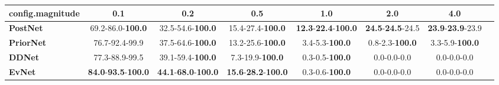 \begin{tabular}{lccccccc}
\toprule
\textbf{config.magnitude} &                                         0.1 &                                         0.2 &                                         0.5 &                                         1.0 &                               2.0 &                               4.0 \\
\midrule
\textbf{PostNet } &                    69.2-86.0-\textbf{100.0} &                    32.5-54.6-\textbf{100.0} &                    15.4-27.4-\textbf{100.0} &  \textbf{12.3}-\textbf{22.4}-\textbf{100.0} &  \textbf{24.5}-\textbf{24.5}-24.5 &  \textbf{23.9}-\textbf{23.9}-23.9 \\
\textbf{PriorNet} &                              76.7-92.4-99.9 &                    37.5-64.6-\textbf{100.0} &                    13.2-25.6-\textbf{100.0} &                      3.4-5.3-\textbf{100.0} &            0.8-2.3-\textbf{100.0} &            3.3-5.9-\textbf{100.0} \\
\textbf{DDNet   } &                              77.3-88.9-99.5 &                    39.1-59.4-\textbf{100.0} &                     7.3-19.9-\textbf{100.0} &                      0.3-0.5-\textbf{100.0} &                       0.0-0.0-0.0 &                       0.0-0.0-0.0 \\
\textbf{EvNet   } &  \textbf{84.0}-\textbf{93.5}-\textbf{100.0} &  \textbf{44.1}-\textbf{68.0}-\textbf{100.0} &  \textbf{15.6}-\textbf{28.2}-\textbf{100.0} &                      0.3-0.6-\textbf{100.0} &                       0.0-0.0-0.0 &                       0.0-0.0-0.0 \\
\bottomrule
\end{tabular}
